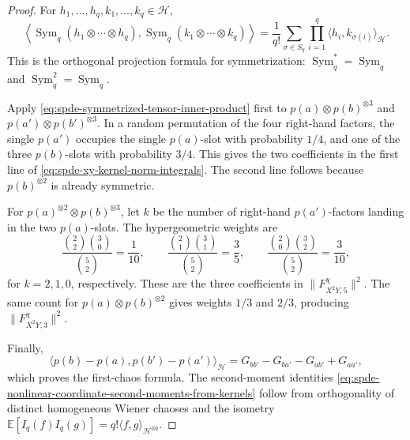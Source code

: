\begin{proof}
For \(h_1,\ldots,h_q,k_1,\ldots,k_q\in\mathcal H\),
\begin{equation}
  \left\langle
    \operatorname{Sym}_q(h_1\otimes\cdots\otimes h_q),
    \operatorname{Sym}_q(k_1\otimes\cdots\otimes k_q)
  \right\rangle
  =
  \frac1{q!}
  \sum_{\sigma\in S_q}
  \prod_{i=1}^q\langle h_i,k_{\sigma(i)}\rangle_{\mathcal H}.
  \label{eq:spde-symmetrized-tensor-inner-product}
\end{equation}
This is the orthogonal projection formula for symmetrization:
\(\operatorname{Sym}_q^*=\operatorname{Sym}_q\) and
\(\operatorname{Sym}_q^2=\operatorname{Sym}_q\).

Apply \eqref{eq:spde-symmetrized-tensor-inner-product} first to
\(p(a)\otimes p(b)^{\otimes3}\) and
\(p(a')\otimes p(b')^{\otimes3}\).  In a random permutation of the four
right-hand factors, the single \(p(a')\) occupies the single \(p(a)\)-slot
with probability \(1/4\), and one of the three \(p(b)\)-slots with
probability \(3/4\).  This gives the two coefficients in the first line of
\eqref{eq:spde-xy-kernel-norm-integrals}.  The second line follows because
\(p(b)^{\otimes2}\) is already symmetric.

For \(p(a)^{\otimes2}\otimes p(b)^{\otimes3}\), let \(k\) be the number of
right-hand \(p(a')\)-factors landing in the two \(p(a)\)-slots.  The
hypergeometric weights are
\[
  \frac{\binom{2}{2}\binom{3}{0}}{\binom{5}{2}}=\frac1{10},\qquad
  \frac{\binom{2}{1}\binom{3}{1}}{\binom{5}{2}}=\frac35,\qquad
  \frac{\binom{2}{0}\binom{3}{2}}{\binom{5}{2}}=\frac3{10},
\]
for \(k=2,1,0\), respectively.  These are the three coefficients in
\(\|F_{X^2Y,5}^{\chi}\|^2\).  The same count for
\(p(a)\otimes p(b)^{\otimes2}\) gives weights \(1/3\) and \(2/3\), producing
\(\|F_{X^2Y,3}^{\chi}\|^2\).

Finally,
\[
  \langle p(b)-p(a),p(b')-p(a')\rangle_{\mathcal H}
  =
  G_{bb'}-G_{ba'}-G_{ab'}+G_{aa'},
\]
which proves the first-chaos formula.  The second-moment identities
\eqref{eq:spde-nonlinear-coordinate-second-moments-from-kernels} follow from
orthogonality of distinct homogeneous Wiener chaoses and the isometry
\(\mathbb E[I_q(f)I_q(g)]
=q!\langle f,g\rangle_{\mathcal H^{\otimes q}}\).
\end{proof}

